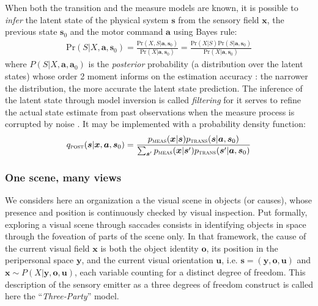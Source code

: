 \documentclass[12pt,twoside,openright]{article}
\begin{document}
When both the transition and the measure models are known, it is possible to \emph{infer} the latent state of the physical system $\boldsymbol{s}$ from the sensory field $\boldsymbol{x}$, the previous state $\boldsymbol{s}_0$ and the motor command $\boldsymbol{a}$ using Bayes rule:
\begin{align}
\text{Pr}(S|X,\boldsymbol{a},\boldsymbol{s}_0) = \frac{\text{Pr}(X,S|\boldsymbol{a},\boldsymbol{s}_0)}{\text{Pr}(X|\boldsymbol{a},\boldsymbol{s}_0)} %
= \frac{\text{Pr}(X|S) \text{Pr}(S|\boldsymbol{a},\boldsymbol{s}_0)}
{\text{Pr}(X|\boldsymbol{a},\boldsymbol{s}_0)}\label{eq:post-Pr}
\end{align}
where $P(S|X,\boldsymbol{a},\boldsymbol{a}_0)$ is the \emph{posterior} probability (a distribution over the latent states) whose order 2 moment informs on the estimation accuracy : the narrower the distribution, the more accurate the latent state prediction. 
The inference of the latent state through model inversion is called \emph{filtering} for it serves to refine the actual state estimate from past observations when the measure process is corrupted by noise \cite{Kalman1960}.
It may be implemented with a probability density function:
\begin{align}
q_\text{\sc post}(\boldsymbol{s}|\boldsymbol{x},\boldsymbol{a}, \boldsymbol{s}_0) 
= \frac{p_\text{\sc meas}(\boldsymbol{x}|\boldsymbol{s}) p_\text{\sc trans}(\boldsymbol{s}|\boldsymbol{a},\boldsymbol{s}_0)}
{\sum_{\boldsymbol{s}'}p_\text{\sc meas}(\boldsymbol{x}|\boldsymbol{s}') p_\text{\sc trans}(\boldsymbol{s}'|\boldsymbol{a},\boldsymbol{s}_0)}\label{eq:post-pdf}
\end{align}


\subsubsection{One scene, many views}

We considers here an organization a the visual scene in objects (or causes), whose presence and position is continuously checked by visual inspection. 
Put formally, exploring a visual scene through saccades consists in identifying objects in space through the foveation of parts of the scene only. 
In that framework, the cause of the current visual field $\boldsymbol{x}$ is both the object identity $\boldsymbol{o}$, its position in the peripersonal space $\boldsymbol{y}$, and the current visual orientation $\boldsymbol{u}$, i.e. $\boldsymbol{s} = (\boldsymbol{y},\boldsymbol{o},\boldsymbol{u})$ and $\boldsymbol{x} \sim P(X|\boldsymbol{y},\boldsymbol{o},\boldsymbol{u})$, each variable counting for a distinct degree of freedom. This description of the sensory emitter as a three degrees of freedom construct is called here the ``\emph{Three-Party}'' model.
\end{document}
